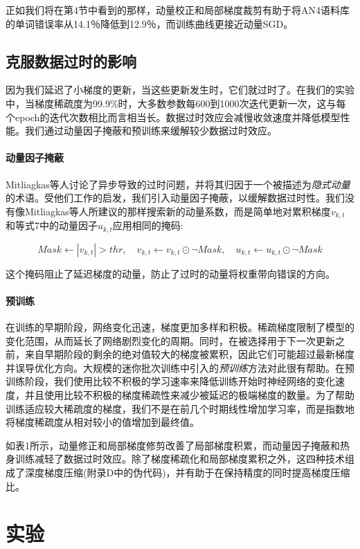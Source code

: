 正如我们将在第4节中看到的那样，动量校正和局部梯度裁剪有助于将AN4语料库的单词错误率从14.1％降低到12.9％，而训练曲线更接近动量SGD。

\subsection{克服数据过时的影响}
因为我们延迟了小梯度的更新，当这些更新发生时，它们就过时了。在我们的实验中，当梯度稀疏度为99.9\%时，大多数参数每600到1000次迭代更新一次，这与每个epoch的迭代次数相比而言相当长。数据过时效应会减慢收敛速度并降低模型性能。我们通过动量因子掩蔽和预训练来缓解较少数据过时效应。

\paragraph{动量因子掩蔽}
Mitliagkas等人讨论了异步导致的过时问题，并将其归因于一个被描述为\emph{隐式动量}的术语。受他们工作的启发，我们引入动量因子掩蔽，以缓解数据过时性。我们没有像Mitliagkas等人所建议的那样搜索新的动量系数，而是简单地对累积梯度$v_{k,t}$和等式7中的动量因子$u_{k,t}$应用相同的掩码:

\begin{equation*}
  Mask \gets |v_{k,t}| >thr,\quad v_{k,t} \gets v_{k,t} \odot \neg Mask, \quad u_{k,t} \gets u_{k,t} \odot \neg Mask
\end{equation*}

这个掩码阻止了延迟梯度的动量，防止了过时的动量将权重带向错误的方向。

\paragraph{预训练}
在训练的早期阶段，网络变化迅速，梯度更加多样和积极。稀疏梯度限制了模型的变化范围，从而延长了网络剧烈变化的周期。同时，在被选择用于下一次更新之前，来自早期阶段的剩余的绝对值较大的梯度被累积，因此它们可能超过最新梯度并误导优化方向。大规模的迷你批次训练中引入的\emph{预训练}方法对此很有帮助。在预训练阶段，我们使用比较不积极的学习速率来降低训练开始时神经网络的变化速度，并且使用比较不积极的梯度稀疏性来减少被延迟的极端梯度的数量。为了帮助训练适应较大稀疏度的梯度，我们不是在前几个时期线性增加学习率，而是指数地将梯度稀疏度从相对较小的值增加到最终值。

如表1所示，动量修正和局部梯度修剪改善了局部梯度积累，而动量因子掩蔽和热身训练减轻了数据过时效应。除了梯度稀疏化和局部梯度累积之外，这四种技术组成了深度梯度压缩(附录D中的伪代码)，并有助于在保持精度的同时提高梯度压缩比。

\section{实验}
